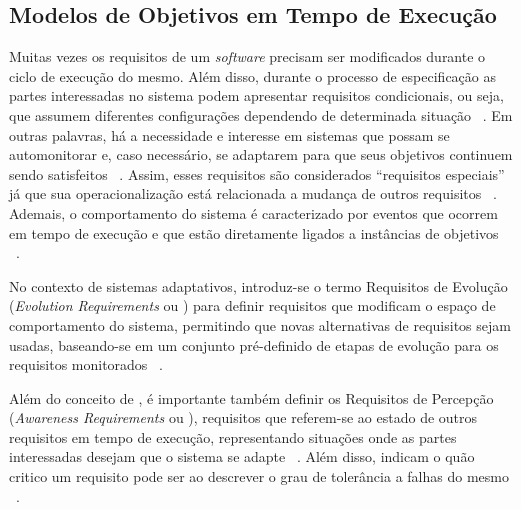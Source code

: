 
\subsection{Modelos de Objetivos em Tempo de Execução}
\label{sec-referencial-engenharia-objetivos-runtime}

Muitas vezes os requisitos de um \textit{software} precisam ser modificados durante o ciclo de execução do mesmo. Além disso, durante o processo de especificação as partes interessadas no sistema podem apresentar requisitos condicionais, ou seja, que assumem diferentes configurações dependendo de determinada situação ~\cite{souza2012requirement}. Em outras palavras, há a necessidade e interesse em sistemas que possam se automonitorar e, caso necessário, se adaptarem para que seus objetivos continuem sendo satisfeitos ~\cite{dalpiaz2013runtime}. Assim, esses requisitos são considerados ``requisitos especiais'' já que sua operacionalização está relacionada a mudança de outros requisitos ~\cite{souza2012requirement}. Ademais, o comportamento do sistema é caracterizado por eventos que ocorrem em tempo de execução e que estão diretamente ligados a instâncias de objetivos ~\cite{dalpiaz2013runtime}.

No contexto de sistemas adaptativos, introduz-se o termo Requisitos de Evolução (\textit{Evolution Requirements} ou \evoreqs) para definir requisitos que modificam o espaço de comportamento do sistema, permitindo que novas alternativas de requisitos sejam usadas, baseando-se em um conjunto pré-definido de etapas de evolução para os requisitos monitorados ~\cite{souza2012requirement}. 

Além do conceito de \evoreqs, é importante também definir os Requisitos de Percepção (\textit{Awareness Requirements} ou \awreqs), requisitos que referem-se ao estado de outros requisitos em tempo de execução, representando situações onde as partes interessadas desejam que o sistema se adapte ~\cite{souza2012requirement}. Além disso, \awreqs indicam o quão critico um requisito pode ser ao descrever o grau de tolerância a falhas do mesmo ~\cite{souza2012requirement}.

